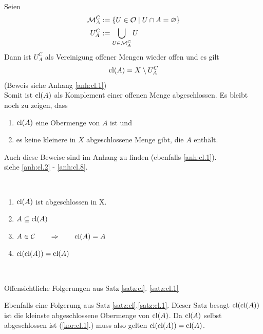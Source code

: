     \begin{bew}%
        \ 

        \noindent
        Seien
        \begin{align} \label{mac}
            \mathcal{M}_A^C &:= \{ U \in \mathcal{O} \mid U \cap A = \varnothing\} \\
            U_A^C &:= \bigcup\limits_{U \in \mathcal{M}_A^C} U
        \end{align}
        Dann ist $U_A^C$ als Vereinigung offener Mengen wieder offen und es gilt 
        \begin{align}
            \text{cl}(A) = X \setminus U_A^C
        \end{align}
        (Beweis siehe Anhang \ref{anh:cl.1})\\
        Somit ist $\text{cl}(A)$ als Komplement einer offenen Menge abgeschlossen. 
        Es bleibt noch zu zeigen, dass
        \begin{enumerate}
            \item $\text{cl}(A)$ eine Obermenge von $A$ ist und
            \item es keine kleinere in $X$ abgeschlossene Menge gibt, die $A$ enthält.
        \end{enumerate}	 
        Auch diese Beweise sind im Anhang zu finden (ebenfalls \ref{anh:cl.1}).
        \\
            
        \noindent
         siehe \ref{anh:cl.2} - \ref{anh:cl.8}.

    \end{bew}


    \begin{kor} \label{kor:cl}\ \vspace{0pt}
        \begin{enumerate}
            \item \label{kor:cl.1} $\text{cl}(A)$ ist abgeschlossen in X.
            \item \label{kor:cl.2} $A \subseteq \text{cl}(A)$
            \item \label{kor:cl.3} $A \in \mathcal{C} \quad \quad \Rightarrow \quad \quad \text{cl}(A) = A$
            \item \label{kor:cl.4} $\text{cl}(\text{cl}(A)) = \text{cl}(A)$
        \end{enumerate}
    \end{kor}

    \begin{bew}
        \

        \noindent 
         Offensichtliche Folgerungen aus Satz \ref{satz:cl}.		\ref{satz:cl.1}

        \noindent
         Ebenfalls eine Folgerung aus Satz \ref{satz:cl}.\ref{satz:cl.1}. Dieser Satz besagt $\text{cl}(\text{cl}(A))$ ist die kleinste abgeschlossene Obermenge von $\text{cl}(A)$. Da $\text{cl}(A)$ selbst abgeschlossen ist (\ref{kor:cl.1}.) muss also gelten $\text{cl}(\text{cl}(A)) = \text{cl}(A)$.

    \end{bew}


